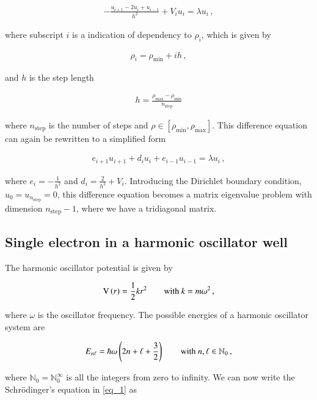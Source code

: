 \documentclass[11pt,english,a4paper]{article}
\begin{document}
\begin{flushleft}
\begin{align*}
-\frac{u_{i+1}-2 u_i+u_{i-1}}{h^2} + V_i u_i = \lambda u_i \,,
\end{align*}

where subscript $i$ is a indication of dependency to $\rho_i$, which is given by

\begin{align*}
\rho_i = \rho_{\mathrm{min}} + i h \,,
\end{align*}

and $h$ is the step length

\begin{align*}
h = \frac{\rho_{\mathrm{max}}-\rho_{\text{min}}}{n_{\mathrm{step}}} 
\end{align*}

where $n_{\mathrm{step}}$ is the number of steps and $\rho\in\left[\rho_{\mathrm{min}},\rho_{\mathrm{max}}\right]$. This difference equation can again be rewritten to a simplified form

\begin{align}
e_{i+1} u_{i+1} + d_i u_i + e_{i-1}  u_{i-1} = \lambda u_i \,,
\label{eq_2}
\end{align}

where $e_i = - \frac{1}{h^2}$ and $d_i = \frac{2}{h^2} + V_i$. Introducing the Dirichlet boundary condition, $u_0 = u_{n_{\mathrm{step}}} = 0$, this difference equation becomes a matrix eigenvalue problem with dimension $n_{\mathrm{step}}-1$, where we have a tridiagonal matrix.

\subsection{Single electron in a harmonic oscillator well}

The harmonic oscillator potential is given by

\begin{align*}
\mathrm{V}\left({r}\right) = \frac{1}{2}kr^2 \qquad \text{with } k = m\omega^2 \,,
\end{align*}

where $\omega$ is the oscillator frequency. The possible energies of a harmonic oscillator system are

\begin{align}
E_{n\ell} = \hbar\omega\left({2n+\ell+\frac{3}{2}}\right) \qquad \text{with } n,\ell\in\mathbb{N}_0 \,,
\label{eq_3}
\end{align}

where $\mathbb{N}_0 = \mathbb{N}_0^{\infty}$ is all the integers from zero to infinity.  We can now write the Schr\"{o}dinger's equation in \eqref{eq_1} as 


\end{flushleft}
\end{document}
